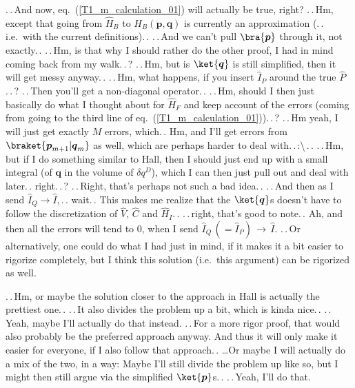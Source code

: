 \documentclass{report}
\begin{document}
.\,.\,And now, eq.\ (\ref{T1_m_calculation_01}) will actually be true, right? .\,.\,Hm, except that going from $\hat H_B$ to $H_B(\boldsymbol{p}, \boldsymbol{q})$ is currently an approximation (.\,.\,i.e.\ with the current definitions).\,. .\,.\,And we can't pull $\bra{\boldsymbol{p}}$ through it, not exactly.\,. .\,.\,Hm, is that why I should rather do the other proof, I had in mind coming back from my walk.\,.\,? .\,.\,Hm, but is $\ket{\boldsymbol{q}}$ is still simplified, then it will get messy anyway.\,. .\,.\,Hm, what happens, if you insert $\hat I_P$ around the true $\hat P$.\,.\,? .\,.\,Then you'll get a non-diagonal operator.\,. .\,.\,Hm, should I then just basically do what I thought about for $\hat H_F$ and keep account of the errors (coming from going to the third line of eq.\ (\ref{T1_m_calculation_01})).\,.\,? .\,.\,Hm yeah, I will just get exactly $M$ errors, which.\,. Hm, and I'll get errors from $\braket{\boldsymbol{p}_{m+1} | \boldsymbol{q}_{m}}$ as well, which are perhaps harder to deal with.\,.\,:\textbackslash\,.\,. .\,.\,Hm, but if I do something similar to Hall, then I should just end up with a small integral (of $\boldsymbol{q}$ in the volume of $\delta q^D$), which I can then just pull out and deal with later.\,. right.\,.\,? .\,.\,Right, that's perhaps not such a bad idea.\,. .\,.\,And then as I send $\hat I_Q \to \hat I$,\,.\,. wait.\,. This makes me realize that the $\ket{\boldsymbol{q}}$s doesn't have to follow the discretization of $\hat V$, $\hat C$ and $\hat H_I$.\,. .\,.\,right, that's good to note.\,. Ah, and then all the errors will tend to 0, when I send $\hat I_Q \,(= \hat I_P)\, \to\, \hat I$. .\,.\,Or alternatively, one could do what I had just in mind, if it makes it a bit easier to rigorize completely, but I think this solution (i.e.\ this argument) can be rigorized as well. 

.\,.\,Hm, or maybe the solution closer to the approach in Hall is actually the prettiest one.\,. .\,.\,It also divides the problem up a bit, which is kinda nice.\,. .\,.\,Yeah, maybe I'll actually do that instead. .\,.\,For a more rigor proof, that would also probably be the preferred approach anyway. And thus it will only make it easier for everyone, if I also follow that approach.\,. 
\ldots Or maybe I will actually do a mix of the two, in a way: Maybe I'll still divide the problem up like so, but I might then still argue via the simplified $\ket{\boldsymbol{p}}$s.\,. %
.\,.\,Yeah, I'll do that. 
\end{document}
